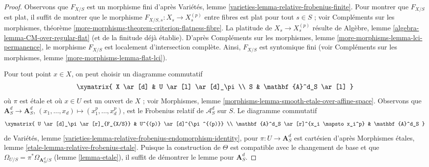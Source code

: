 \begin{proof}
Observons que $F_{X/S}$ est un morphisme fini d'après
Variétés, lemme \ref{varieties-lemma-relative-frobenius-finite}.
Pour montrer que $F_{X/S}$ est plat, il suffit de montrer que
le morphisme $F_{X/S, s} : X_s \to X^{(p)}_s$ entre fibres
est plat pour tout $s \in S$ ; voir Compléments sur les morphismes, théorème
\ref{more-morphisms-theorem-criterion-flatness-fibre}.
La platitude de $X_s \to X^{(p)}_s$ résulte de
Algèbre, lemme \ref{algebra-lemma-CM-over-regular-flat}
(et de la finitude déjà établie).
D'après Compléments sur les morphismes, lemme
\ref{more-morphisms-lemma-lci-permanence},
le morphisme $F_{X/S}$ est localement d'intersection complète.
Ainsi, $F_{X/S}$ est syntomique fini (voir
Compléments sur les morphismes, lemme \ref{more-morphisms-lemma-flat-lci}).

\medskip\noindent
Pour tout point $x \in X$, on peut choisir un diagramme commutatif
$$
\xymatrix{
X \ar[d] & U \ar[l] \ar[d]_\pi \\
S & \mathbf{A}^d_S \ar[l]
}
$$
où $\pi$ est étale et où $x \in U$ est un ouvert de $X$ ; voir
Morphismes, lemme \ref{morphisms-lemma-smooth-etale-over-affine-space}.
Observons que
$\mathbf{A}^d_S \to \mathbf{A}^d_S$, $(x_1, \ldots, x_d) \mapsto
(x_1^p, \ldots, x_d^p)$, est le Frobenius relatif de $\mathcal{A}^d_S$
sur $S$. Le diagramme commutatif
$$
\xymatrix{
U \ar[d]_\pi \ar[r]_{F_{X/S}} & U^{(p)} \ar[d]^{\pi^{(p)}} \\
\mathbf{A}^d_S \ar[r]^{x_i \mapsto x_i^p} & \mathbf{A}^d_S
}
$$
de
Variétés, lemme \ref{varieties-lemma-relative-frobenius-endomorphism-identity},
pour $\pi : U \to \mathbf{A}^d_S$ est cartésien d'après
Morphismes étales, lemme
\ref{etale-lemma-relative-frobenius-etale}.
Puisque la construction de $\Theta$ est compatible avec le changement de base
et que $\Omega_{U/S} = \pi^*\Omega_{\mathbf{A}^d_S/S}$
(lemme \ref{lemma-etale}),
il suffit de démontrer le lemme pour
$\mathbf{A}^d_S$.


\end{proof}
